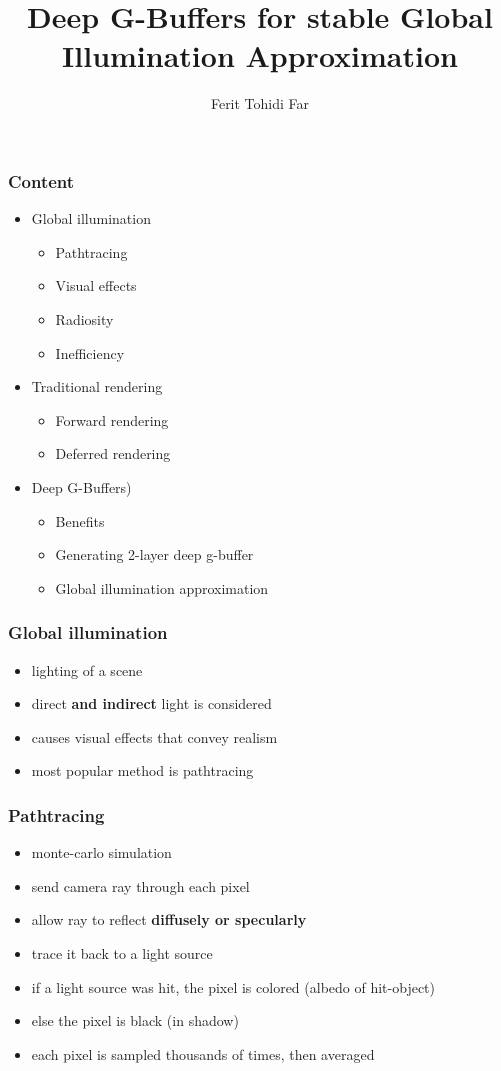 \documentclass{beamer}
\title{Deep G-Buffers for stable Global Illumination Approximation}
\author{Ferit Tohidi Far}
\begin{document}
	\maketitle

	\begin{frame}
		\frametitle{Content}
		\begin{itemize}
			\item Global illumination
				\begin{itemize}
					\item Pathtracing
					\item Visual effects
					\item Radiosity
					\item Inefficiency
				\end{itemize}
			\item Traditional rendering
				\begin{itemize}
					\item Forward rendering
					\item Deferred rendering
				\end{itemize}
			\item Deep G-Buffers)
				\begin{itemize}
					\item Benefits
					\item Generating 2-layer deep g-buffer
					\item Global illumination approximation
				\end{itemize}
		\end{itemize}
	\end{frame}

	\begin{frame}
		\frametitle{Global illumination}
		\begin{itemize}
			\item lighting of a scene
			\item direct \textbf{and indirect} light is considered
			\item causes visual effects that convey realism
			\item most popular method is pathtracing
		\end{itemize}
	\end{frame}

	\begin{frame}
		\frametitle{Pathtracing}
		\begin{itemize}
			\item monte-carlo simulation
			\item send camera ray through each pixel
			\item allow ray to reflect \textbf{diffusely or specularly}
			\item trace it back to a light source
			\item if a light source was hit, the pixel is colored (albedo of hit-object)
			\item else the pixel is black (in shadow)
			\item each pixel is sampled thousands of times, then averaged
		\end{itemize}
	\end{frame}
\end{document}
